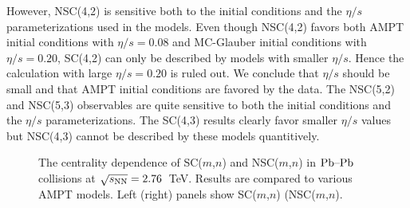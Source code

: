 However, NSC(4,2) is sensitive both to the initial conditions and the $\eta/s$ parameterizations used in the models.
Even though NSC(4,2) favors both AMPT initial conditions with $\eta/s=0.08$ and MC-Glauber initial conditions with $\eta/s=0.20$,
SC(4,2) can only be described by models with smaller $\eta/s$. Hence the calculation with large $\eta/s=0.20$ is ruled out. We conclude that $\eta/s$ should be small and that AMPT initial conditions are favored by the data.
The NSC(5,2) and NSC(5,3) observables are quite sensitive to both the initial conditions and the $\eta/s$ parameterizations.
The SC(4,3) results clearly favor smaller $\eta/s$ values but NSC(4,3) cannot be described by these models quantitively.

 \begin{figure}[t!]
	\begin{center}
        \caption{The centrality dependence of SC($m$,$n$) and NSC($m$,$n$) in $\textnormal{Pb--Pb}$ collisions at $\sqrt{s_{\textnormal{NN}}}=2.76$~TeV. Results are compared to various AMPT models. Left (right) panels show SC($m$,$n$)  (NSC($m$,$n$).}
        \label{fig:Figure_6}
        \end{center}   
 \end{figure}
 
